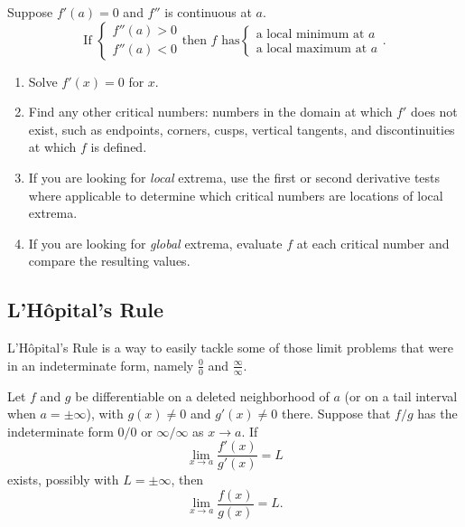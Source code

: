 \begin{thm}
Suppose $f'(a)=0$ and $f''$ is continuous at $a$.
$$\text{If } \begin{cases}
f''(a)>0\\
f''(a)<0
\end{cases}
\text{then $f$ has}
\begin{cases}
\text{a local minimum at $a$}\\
\text{a local maximum at $a$}
\end{cases}.$$
\end{thm}


\begin{strat}
\begin{enumerate}[leftmargin=1em]
\item Solve $f'(x)=0$ for $x$.
\item Find any other critical numbers: numbers in the domain at which $f'$ does not exist, such as endpoints, corners, cusps, vertical tangents, and discontinuities at which $f$ is defined.
\item If you are looking for \textit{local} extrema, use the first or second derivative tests where applicable to determine which critical numbers are locations of local extrema.
\item If you are looking for \textit{global} extrema, evaluate $f$ at each critical number and compare the resulting values.
\end{enumerate}
\end{strat}


\subsection{L'H\^opital's Rule}

L'H\^opital's Rule is a way to easily tackle some of those limit problems that were in an indeterminate form, namely $\frac{0}{0}$ and $\frac{\infty}{\infty}$.

\begin{thm}
Let $f$ and $g$ be differentiable on a deleted neighborhood of $a$ (or on a
tail interval when $a=\pm\infty$), with $g(x)\ne0$ and $g'(x)\ne0$ there.
Suppose that $f/g$ has the indeterminate form $0/0$ or $\infty/\infty$ as
$x\to a$. If
$$\lim_{x\to a}\frac{f'(x)}{g'(x)}=L$$
exists, possibly with $L=\pm\infty$, then
$$\lim_{x\to a}\frac{f(x)}{g(x)}=L.$$
\end{thm}

